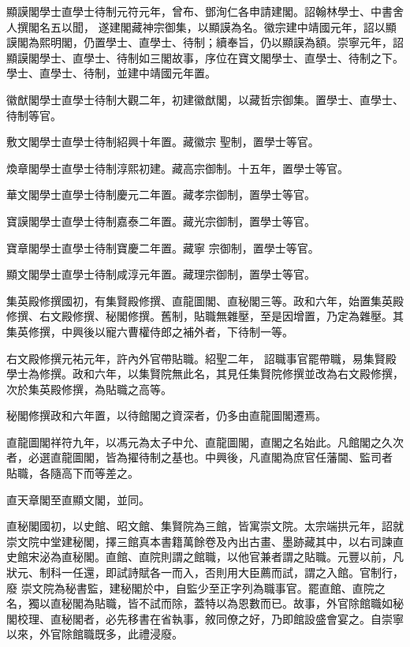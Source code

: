 \begin{pinyinscope}
 顯謨閣學士直學士待制元符元年，曾布、鄧洵仁各申請建閣。詔翰林學士、中書舍人撰閣名五以聞，
 遂建閣藏神宗御集，以顯謨為名。徽宗建中靖國元年，詔以顯謨閣為熙明閣，仍置學士、直學士、待制；續奉旨，仍以顯謨為額。崇寧元年，詔顯謨閣學士、直學士、待制如三閣故事，序位在寶文閣學士、直學士、待制之下。學士、直學士、待制，並建中靖國元年置。



 徽猷閣學士直學士待制大觀二年，初建徽猷閣，以藏哲宗御集。置學士、直學士、待制等官。



 敷文閣學士直學士待制紹興十年置。藏徽宗
 聖制，置學士等官。



 煥章閣學士直學士待制淳熙初建。藏高宗御制。十五年，置學士等官。



 華文閣學士直學士待制慶元二年置。藏孝宗御制，置學士等官。



 寶謨閣學士直學士待制嘉泰二年置。藏光宗御制，置學士等官。



 寶章閣學士直學士待制寶慶二年置。藏寧
 宗御制，置學士等官。



 顯文閣學士直學士待制咸淳元年置。藏理宗御制，置學士等官。



 集英殿修撰國初，有集賢殿修撰、直龍圖閣、直秘閣三等。政和六年，始置集英殿修撰、右文殿修撰、秘閣修撰。舊制，貼職無雜壓，至是因增置，乃定為雜壓。其集英修撰，中興後以寵六曹權侍郎之補外者，下待制一等。



 右文殿修撰元祐元年，許內外官帶貼職。紹聖二年，
 詔職事官罷帶職，易集賢殿學士為修撰。政和六年，以集賢院無此名，其見任集賢院修撰並改為右文殿修撰，次於集英殿修撰，為貼職之高等。



 秘閣修撰政和六年置，以待館閣之資深者，仍多由直龍圖閣遷焉。



 直龍圖閣祥符九年，以馮元為太子中允、直龍圖閣，直閣之名始此。凡館閣之久次者，必選直龍圖閣，皆為擢待制之基也。中興後，凡直閣為庶官任藩閫、監司者
 貼職，各隨高下而等差之。



 直天章閣至直顯文閣，並同。



 直秘閣國初，以史館、昭文館、集賢院為三館，皆寓崇文院。太宗端拱元年，詔就崇文院中堂建秘閣，擇三館真本書籍萬餘卷及內出古畫、墨跡藏其中，以右司諫直史館宋泌為直秘閣。直館、直院則謂之館職，以他官兼者謂之貼職。元豐以前，凡狀元、制科一任還，即試詩賦各一而入，否則用大臣薦而試，謂之入館。官制行，廢
 崇文院為秘書監，建秘閣於中，自監少至正字列為職事官。罷直館、直院之名，獨以直秘閣為貼職，皆不試而除，蓋特以為恩數而已。故事，外官除館職如秘閣校理、直秘閣者，必先移書在省執事，敘同僚之好，乃即館設盛會宴之。自崇寧以來，外官除館職既多，此禮浸廢。




\end{pinyinscope}
